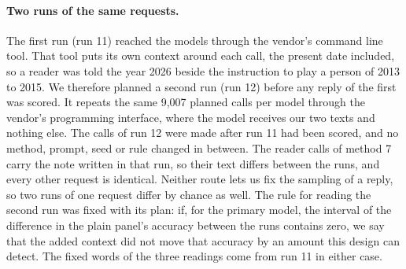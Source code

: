 \paragraph{Two runs of the same requests.} The first run (run 11) reached the models through the vendor's command line tool. That tool puts its own context around each call, the present date included, so a reader was told the year 2026 beside the instruction to play a person of 2013 to 2015. We therefore planned a second run (run 12) before any reply of the first was scored. It repeats the same 9,007 planned calls per model through the vendor's programming interface, where the model receives our two texts and nothing else. The calls of run 12 were made after run 11 had been scored, and no method, prompt, seed or rule changed in between. The reader calls of method 7 carry the note written in that run, so their text differs between the runs, and every other request is identical. Neither route lets us fix the sampling of a reply, so two runs of one request differ by chance as well. The rule for reading the second run was fixed with its plan: if, for the primary model, the interval of the difference in the plain panel's accuracy between the runs contains zero, we say that the added context did not move that accuracy by an amount this design can detect. The fixed words of the three readings come from run 11 in either case.

